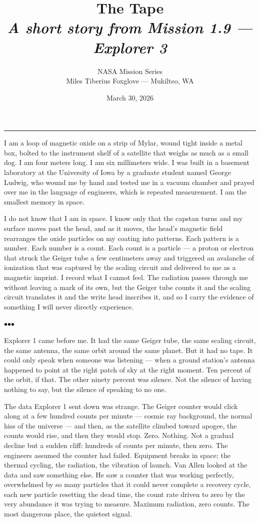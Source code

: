 \documentclass[12pt, letterpaper]{article}
\title{\Huge\textbf{The Tape}\\[0.5em]\large\textit{A short story from Mission 1.9 --- Explorer 3}}
\author{NASA Mission Series\\[0.3em]\small Miles Tiberius Foxglove --- Mukilteo, WA}
\date{March 30, 2026}
\begin{document}
\maketitle
\thispagestyle{empty}

\vspace{1em}
\noindent\rule{\textwidth}{0.4pt}
\vspace{1em}

\noindent I am a loop of magnetic oxide on a strip of Mylar, wound tight inside a metal box, bolted to the instrument shelf of a satellite that weighs as much as a small dog. I am four meters long. I am six millimeters wide. I was built in a basement laboratory at the University of Iowa by a graduate student named George Ludwig, who wound me by hand and tested me in a vacuum chamber and prayed over me in the language of engineers, which is repeated measurement. I am the smallest memory in space.

I do not know that I am in space. I know only that the capstan turns and my surface moves past the head, and as it moves, the head's magnetic field rearranges the oxide particles on my coating into patterns. Each pattern is a number. Each number is a count. Each count is a particle --- a proton or electron that struck the Geiger tube a few centimeters away and triggered an avalanche of ionization that was captured by the scaling circuit and delivered to me as a magnetic imprint. I record what I cannot feel. The radiation passes through me without leaving a mark of its own, but the Geiger tube counts it and the scaling circuit translates it and the write head inscribes it, and so I carry the evidence of something I will never directly experience.

\bigskip
\centerline{$\bullet$\quad$\bullet$\quad$\bullet$}
\bigskip

Explorer 1 came before me. It had the same Geiger tube, the same scaling circuit, the same antenna, the same orbit around the same planet. But it had no tape. It could only speak when someone was listening --- when a ground station's antenna happened to point at the right patch of sky at the right moment. Ten percent of the orbit, if that. The other ninety percent was silence. Not the silence of having nothing to say, but the silence of speaking to no one.

The data Explorer 1 sent down was strange. The Geiger counter would click along at a few hundred counts per minute --- cosmic ray background, the normal hiss of the universe --- and then, as the satellite climbed toward apogee, the counts would rise, and then they would stop. Zero. Nothing. Not a gradual decline but a sudden cliff: hundreds of counts per minute, then zero. The engineers assumed the counter had failed. Equipment breaks in space; the thermal cycling, the radiation, the vibration of launch. Van Allen looked at the data and saw something else. He saw a counter that was working perfectly, overwhelmed by so many particles that it could never complete a recovery cycle, each new particle resetting the dead time, the count rate driven to zero by the very abundance it was trying to measure. Maximum radiation, zero counts. The most dangerous place, the quietest signal.
\end{document}
